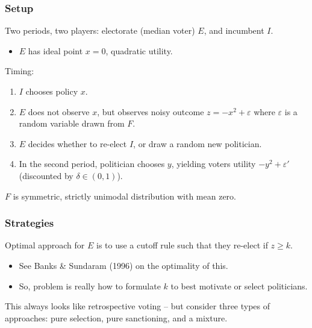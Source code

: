 \documentclass[10pt]{beamer}
\begin{document}
\begin{frame}

\frametitle{Setup}

Two periods, two players: electorate (median voter) $E$, and incumbent $I$. 
\begin{itemize}
\item $E$ has ideal point $x=0$, quadratic utility.
\end{itemize}

\bigskip

Timing: \begin{enumerate}

\item $I$ chooses policy $x$. 
\item $E$ does not observe $x$, but observes noisy outcome $z = -x^2 + \varepsilon$ where $\varepsilon$ is a random variable drawn from $F$.
\item $E$ decides whether to re-elect $I$, or draw a random new politician. 
\item In the second period, politician chooses $y$, yielding voters utility $-y^2+\varepsilon'$ (discounted by $\delta\in(0,1)$). 
\end{enumerate}

\bigskip

$F$ is symmetric, strictly unimodal distribution with mean zero. 

\end{frame}

\begin{frame}

\frametitle{Strategies}

Optimal approach for $E$ is to use a cutoff rule such that they re-elect if $z\geq k$. 
\begin{itemize}
\item See Banks \& Sundaram (1996) on the optimality of this.
\item So, problem is really how to formulate $k$ to best motivate or select politicians.
\end{itemize}

\bigskip

This always looks like retrospective voting -- but consider three types of approaches: pure selection, pure sanctioning, and a mixture.

\end{frame}
\end{document}
